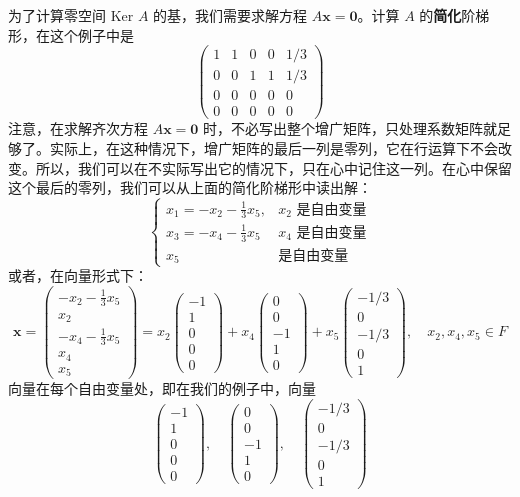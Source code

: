 为了计算零空间 $\text{Ker } A$ 的基，我们需要求解方程 $A \mathbf{x} = \mathbf{0}$。计算 $A$ 的\textbf{简化}阶梯形，在这个例子中是
$$
\begin{pmatrix}
1 & 1 & 0 & 0 & 1/3 \\
0 & 0 & 1 & 1 & 1/3 \\
0 & 0 & 0 & 0 & 0 \\
0 & 0 & 0 & 0 & 0
\end{pmatrix}
$$
注意，在求解齐次方程 $A \mathbf{x} = \mathbf{0}$ 时，不必写出整个增广矩阵，只处理系数矩阵就足够了。实际上，在这种情况下，增广矩阵的最后一列是零列，它在行运算下不会改变。所以，我们可以在不实际写出它的情况下，只在心中记住这一列。在心中保留这个最后的零列，我们可以从上面的简化阶梯形中读出解：
$$
\begin{cases}
x_1 = -x_2 - \frac{1}{3} x_5, & x_2 \text{ 是自由变量} \\
x_3 = -x_4 - \frac{1}{3} x_5 & x_4 \text{ 是自由变量} \\
x_5 & \text{是自由变量}
\end{cases}
$$
或者，在向量形式下：
$$
\mathbf{x} = \begin{pmatrix} -x_2 - \frac{1}{3} x_5 \\ x_2 \\ -x_4 - \frac{1}{3} x_5 \\ x_4 \\ x_5 \end{pmatrix} = x_2 \begin{pmatrix} -1 \\ 1 \\ 0 \\ 0 \\ 0 \end{pmatrix} + x_4 \begin{pmatrix} 0 \\ 0 \\ -1 \\ 1 \\ 0 \end{pmatrix} + x_5 \begin{pmatrix} -1/3 \\ 0 \\ -1/3 \\ 0 \\ 1 \end{pmatrix}, \quad x_2, x_4, x_5 \in F
$$
向量在每个自由变量处，即在我们的例子中，向量
$$
\begin{pmatrix} -1 \\ 1 \\ 0 \\ 0 \\ 0 \end{pmatrix}, \quad \begin{pmatrix} 0 \\ 0 \\ -1 \\ 1 \\ 0 \end{pmatrix}, \quad \begin{pmatrix} -1/3 \\ 0 \\ -1/3 \\ 0 \\ 1 \end{pmatrix}
$$
